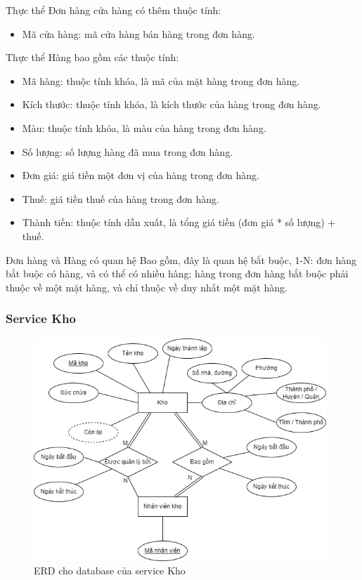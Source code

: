 \par Thực thể Đơn hàng cửa hàng có thêm thuộc tính:
\begin{itemize}
	\item Mã cửa hàng: mã cửa hàng bán hàng trong đơn hàng.
\end{itemize}

\par Thực thể Hàng bao gồm các thuộc tính:
\begin{itemize}
	\item Mã hàng: thuộc tính khóa, là mã của mặt hàng trong đơn hàng.
	\item Kích thước: thuộc tính khóa, là kích thước của hàng trong đơn hàng.
	\item Màu: thuộc tính khóa, là màu của hàng trong đơn hàng.
	\item Số lượng: số lượng hàng đã mua trong đơn hàng.
	\item Đơn giá: giá tiền một đơn vị của hàng trong đơn hàng.
	\item Thuế: giá tiền thuế của hàng trong đơn hàng.
	\item Thành tiền: thuộc tính dẫn xuất, là tổng giá tiền (đơn giá * số lượng) + thuế.
\end{itemize}

\par Đơn hàng và Hàng có quan hệ Bao gồm, đây là quan hệ bắt buộc, 1-N: đơn hàng bắt buộc có hàng, và có thể có nhiều hàng; hàng trong đơn hàng bắt buộc phải thuộc về một mặt hàng, và chỉ thuộc về duy nhất một mặt hàng.

\subsubsection{Service Kho}
\begin{figure}[!htp]
	\begin{center}
		\includegraphics[width=11cm]{img/database/erd/shop_online-Kho.png}
		\newline
		\caption{ERD cho database của service Kho}
	\end{center}
\end{figure}

